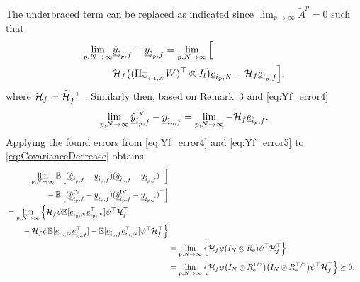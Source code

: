 The underbraced term can be replaced as indicated since $\lim_{p\rightarrow\infty}\tilde{A}^p=0$ such that
\begin{align}\label{eq:Yf_error4}
\begin{split}
    \lim_{p,N\rightarrow\infty} &\datavec{\hat{y}}{\hat{i}_p,f}-\datavec{y}{\hat{i}_p,f}%
     = \lim_{p,N\rightarrow\infty}\Big[\\
     &\mathcal{H}_f\big((\Pi_{\Psi_{i,1,N}}^\bot W)^\top \otimes I_l\big)\datavec{e}{i_p,N}-\mathcal{H}_f\datavec{e}{\hat{i}_p,f}\Big],
\end{split}
\end{align}
where $\mathcal{H}_f=\mathcal{\widetilde{H}}_f\inv$~\citep[Lemma~1]{Houtzager2012}. Similarly then, based on Remark~3 and \eqref{eq:Yf_error4}
\begin{align}\label{eq:Yf_error5}
    \lim_{p,N\rightarrow\infty} \datavec{\hat{y}}{\hat{i}_p,f}^\mathrm{IV}-\datavec{y}{\hat{i}_p,f}%
     = \lim_{p,N\rightarrow\infty}-\mathcal{H}_f\datavec{e}{\hat{i}_p,f}.
\end{align}
Applying the found errors from \eqref{eq:Yf_error4} and \eqref{eq:Yf_error5} to \eqref{eq:CovarianceDecrease} obtains
\begin{align}\label{eq:Cov}
\begin{split}
        &\lim_{p,N\rightarrow\infty} \mathbb{E}\left[(\underline{\hat{y}}_{\hat{i}_p,f}-\underline{y}_{\hat{i}_p,f})(\underline{\hat{y}}_{\hat{i}_p,f}-\underline{y}_{\hat{i}_p,f})^\top\right]\\
        &\qquad\mkern1mu-\mathbb{E}\left[(\underline{\hat{y}}_{\hat{i}_p,f}^\mathrm{IV}-\underline{y}_{\hat{i}_p,f})(\underline{\hat{y}}_{\hat{i}_p,f}^\mathrm{IV}-\underline{y}_{\hat{i}_p,f})^\top\right]
\end{split}\notag\\
\begin{split}
        &=\lim_{p,N\rightarrow\infty}\Big\{\mathcal{H}_f\psi\mathbb{E}[\underline{e}_{i_p,N}\underline{e}_{i_p,N}^\top]\psi^\top\mathcal{H}_f^\top\\
        &\qquad\mkern1mu-\mathcal{H}_f\psi\mathbb{E}[\underline{e}_{i_p,N}\underline{e}_{\hat{i}_p,f}^\top]-\mathbb{E}[\underline{e}_{\hat{i}_p,f}\underline{e}_{i_p,N}^\top]\psi^\top\mathcal{H}_f^\top\Big\}
\end{split}\notag\\
&=\lim_{p,N\rightarrow\infty}\Big\{\mathcal{H}_f\psi(I_N\otimes R_\mathrm{e})\psi^\top\mathcal{H}_f^\top\Big\}\notag\\
&=\lim_{p,N\rightarrow\infty}\Big\{\mathcal{H}_f\psi\big(I_N\otimes R_\mathrm{e}^{1/2}\big)\big(I_N\otimes R_\mathrm{e}^{\top/2}\big)\psi^\top\mathcal{H}_f^\top\Big\}\notag\succeq 0,
\end{align}
